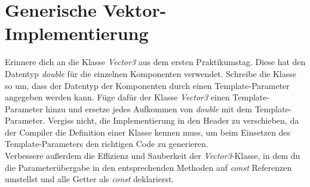 \documentclass[
  accentcolor=tud1c,	%
  colorbacktitle,		%
  inverttitle,			%
  german,				%
  twoside
]{tudexercise}
\begin{document}
\section{Generische Vektor-Implementierung}
Erinnere dich an die Klasse \emph{Vector3} aus dem ersten Praktikumstag. Diese hat den Datentyp \emph{double} für die einzelnen Komponenten verwendet. Schreibe die Klasse so um, dass der Datentyp der Komponenten durch einen Template-Parameter angegeben werden kann.
Füge dafür der Klasse \emph{Vector3} einen Template-Parameter hinzu und ersetze jedes Aufkommen von \emph{double} mit dem Template-Parameter.
Vergiss nicht, die Implementierung in den Header zu verschieben, da der Compiler die Definition einer Klasse kennen muss, um beim Einsetzen des Template-Parameters den richtigen Code zu generieren.\\

Verbessere außerdem die Effizienz und Sauberkeit der \emph{Vector3}-Klasse, in dem du die Parameterübergabe in den entsprechenden Methoden auf \emph{const} Referenzen umstellst und alle Getter als \emph{const} deklarierst. 
\end{document}
